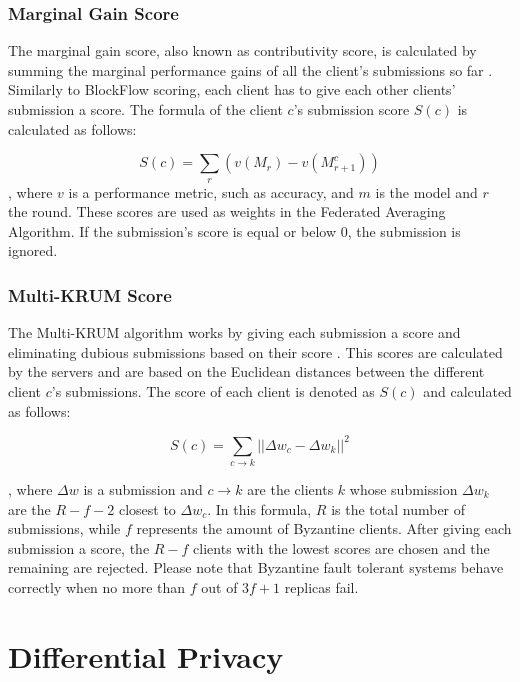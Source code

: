 \subsubsection{Marginal Gain Score}

The marginal gain score, also known as contributivity score, is calculated by summing the marginal performance gains of all the client's submissions so far \cite{10.48550/arxiv.2011.07516}. Similarly to BlockFlow scoring, each client has to give each other clients' submission a score. The formula of the client $c$'s submission score $S(c)$ is calculated as follows:

\begin{equation}
    \label{eq:marginal-gain}
    S(c)= \sum_r(v(M_r)-v(M^c_{r+1}))
\end{equation}
, where $v$ is a performance metric, such as accuracy, and $m$ is the model and $r$ the round. These scores are used as weights in the Federated Averaging Algorithm. If the submission's score is equal or below $0$, the submission is ignored.

\subsubsection{Multi-KRUM Score}

The Multi-KRUM algorithm works by giving each submission a score and eliminating dubious submissions based on their score \cite{9170559, Peyvandi2022, 9292450}. This scores are calculated by the servers and are based on the Euclidean distances between the different client $c$'s submissions. The score of each client is denoted as $S(c)$ and calculated as follows:

\begin{equation}
    \label{eq:multi-krum}
    S(c)=\sum_{c \rightarrow k} || \Delta w_c - \Delta w_k|| ^2
\end{equation}

, where $\Delta w$ is a submission and $c \rightarrow k$ are the clients $k$ whose submission $\Delta w_k$ are the $R-f-2$ closest to $\Delta w_c$. In this formula, $R$ is the total number of submissions, while $f$ represents the amount of Byzantine clients. After giving each submission a score, the $R-f$ clients with the lowest scores are chosen and the remaining are rejected. Please note that Byzantine fault tolerant systems behave correctly when no more than $f$ out of $3f+1$ replicas fail.

\section{Differential Privacy}\label{background:diff_priv}

